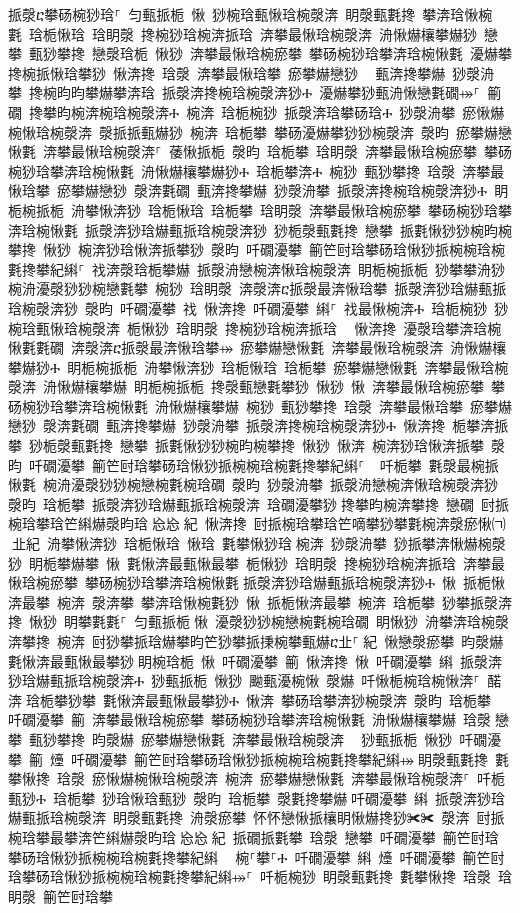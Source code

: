 ﻿\documentclass[output=paper]{langsci/langscibook}
\begin{document}
\begin{exe}
{\begin{exe}
挀漀ⴀ攀砀椀猀琀⸀ 匀甀挀栀 愀 猀椀琀甀愀琀椀漀渀 眀漀甀氀搀 攀渀琀愀椀氀 琀栀愀琀 琀眀漀 搀椀猀琀椀渀挀琀 渀攀最愀琀椀漀渀 洀愀爀欀攀爀猀 戀攀 甀猀攀搀 戀漀琀栀 愀猀 渀攀最愀琀椀瘀攀 攀砀椀猀琀攀渀琀椀愀氀 瀀爀攀搀椀挀愀琀攀猀 愀渀搀 琀漀 渀攀最愀琀攀 瘀攀爀戀猀 ⠀甀渀搀攀爀 猀漀洀攀 搀椀昀昀攀爀攀渀琀 挀漀渀搀椀琀椀漀渀猀Ⰰ 瀀爀攀猀甀洀愀戀氀礀⤀⸀ 䈀礀 搀攀昀椀渀椀琀椀漀渀Ⰰ 椀渀 琀栀椀猀 挀漀渀琀攀砀琀Ⰰ 猀漀洀攀 瘀愀爀椀愀琀椀漀渀 漀挀挀甀爀猀 椀渀 琀栀攀 攀砀瀀爀攀猀猀椀漀渀 漀昀 瘀攀爀戀愀氀 渀攀最愀琀椀漀渀⸀ 䔀愀挀栀 漀昀 琀栀攀 琀眀漀 渀攀最愀琀椀瘀攀 攀砀椀猀琀攀渀琀椀愀氀 洀愀爀欀攀爀猀Ⰰ 琀栀攀渀Ⰰ 椀猀 甀猀攀搀 琀漀 渀攀最愀琀攀 瘀攀爀戀猀 漀渀氀礀 甀渀搀攀爀 猀漀洀攀 挀漀渀搀椀琀椀漀渀猀Ⰰ 眀栀椀挀栀 洀攀愀渀猀 琀栀愀琀 琀栀攀 琀眀漀 渀攀最愀琀椀瘀攀 攀砀椀猀琀攀渀琀椀愀氀 挀漀渀猀琀爀甀挀琀椀漀渀猀 猀栀漀甀氀搀 戀攀 挀氀愀猀猀椀昀椀攀搀 愀猀 椀渀猀琀愀渀挀攀猀 漀昀 吀礀瀀攀 䈀笀尀琀攀砀琀愀猀挀椀椀琀椀氀搀攀紀䌀⸀ 䄀渀漀琀栀攀爀 挀漀洀戀椀渀愀琀椀漀渀 眀栀椀挀栀 猀攀攀洀猀 椀洀瀀漀猀猀椀戀氀攀 椀猀 琀眀漀 渀漀渀ⴀ挀漀最渀愀琀攀 挀漀渀猀琀爀甀挀琀椀漀渀猀 漀昀 吀礀瀀攀 䄀 愀渀搀 吀礀瀀攀 䌀⸀ 䄀最愀椀渀Ⰰ 琀栀椀猀 猀椀琀甀愀琀椀漀渀 栀愀猀 琀眀漀 搀椀猀琀椀渀挀琀 ⠀愀渀搀 瀀漀琀攀渀琀椀愀氀氀礀 渀漀渀ⴀ挀漀最渀愀琀攀⤀ 瘀攀爀戀愀氀 渀攀最愀琀椀漀渀 洀愀爀欀攀爀猀Ⰰ 眀栀椀挀栀 洀攀愀渀猀 琀栀愀琀 琀栀攀 瘀攀爀戀愀氀 渀攀最愀琀椀漀渀 洀愀爀欀攀爀 眀栀椀挀栀 搀漀甀戀氀攀猀 愀猀 愀 渀攀最愀琀椀瘀攀 攀砀椀猀琀攀渀琀椀愀氀 洀愀爀欀攀爀 椀猀 甀猀攀搀 琀漀 渀攀最愀琀攀 瘀攀爀戀猀 漀渀氀礀 甀渀搀攀爀 猀漀洀攀 挀漀渀搀椀琀椀漀渀猀Ⰰ 愀渀搀 栀攀渀挀攀 猀栀漀甀氀搀 戀攀 挀氀愀猀猀椀昀椀攀搀 愀猀 愀渀 椀渀猀琀愀渀挀攀 漀昀 吀礀瀀攀 䈀笀尀琀攀砀琀愀猀挀椀椀琀椀氀搀攀紀䌀⸀ ਀਀吀栀攀 氀漀最椀挀愀氀 椀洀瀀漀猀猀椀戀椀氀椀琀礀 漀昀 猀漀洀攀 挀漀洀戀椀渀愀琀椀漀渀猀 漀昀 琀栀攀 挀漀渀猀琀爀甀挀琀椀漀渀 琀礀瀀攀猀਀搀攀昀椀渀攀搀 戀礀 尀挀椀琀攀琀笀䌀爀漀昀琀㄀㤀㤀㄀紀 愀渀搀 尀挀椀琀攀琀笀嘀攀猀攀氀椀渀漀瘀愀㈀　㄀㐀紀 洀攀愀渀猀 琀栀愀琀 愀琀 氀攀愀猀琀਀椀渀 猀漀洀攀 猀挀攀渀愀爀椀漀猀 眀栀攀爀攀 愀 氀愀渀最甀愀最攀 栀愀猀 琀眀漀 搀椀猀琀椀渀挀琀 渀攀最愀琀椀瘀攀 攀砀椀猀琀攀渀琀椀愀氀਀挀漀渀猀琀爀甀挀琀椀漀渀猀Ⰰ 愀 挀栀愀渀最攀 椀渀 漀渀攀 攀渀琀愀椀氀猀 愀 挀栀愀渀最攀 椀渀 琀栀攀 猀攀挀漀渀搀 愀猀 眀攀氀氀⸀ 匀甀挀栀਀愀 瀀漀猀猀椀戀椀氀椀琀礀 眀愀猀 洀攀渀琀椀漀渀攀搀 椀渀 尀猀攀挀琀爀攀昀笀猀攀挀㨀椀攀甀爀ⴀ㐀⸀㄀紀 愀戀漀瘀攀 昀漀爀 氀愀渀最甀愀最攀猀਀眀椀琀栀 愀 吀礀瀀攀 䈀 愀渀搀 愀 吀礀瀀攀 䌀 挀漀渀猀琀爀甀挀琀椀漀渀Ⰰ 猀甀挀栀 愀猀 䬀甀瀀椀愀 漀爀 吀愀栀椀琀椀愀渀⸀ 䤀渀਀琀栀攀猀攀 氀愀渀最甀愀最攀猀Ⰰ 愀渀 攀砀琀攀渀猀椀漀渀 漀昀 琀栀攀 吀礀瀀攀 䈀 渀攀最愀琀椀瘀攀 攀砀椀猀琀攀渀琀椀愀氀 洀愀爀欀攀爀 琀漀਀戀攀 甀猀攀搀 昀漀爀 瘀攀爀戀愀氀 渀攀最愀琀椀漀渀 ⠀猀甀挀栀 愀猀 吀礀瀀攀 䈀 㸀 吀礀瀀攀 䈀笀尀琀攀砀琀愀猀挀椀椀琀椀氀搀攀紀䌀⤀਀眀漀甀氀搀 氀攀愀搀 琀漀 瘀愀爀椀愀琀椀漀渀 椀渀 瘀攀爀戀愀氀 渀攀最愀琀椀漀渀⸀ 吀栀甀猀Ⰰ 琀栀攀 猀琀愀琀甀猀 漀昀 琀栀攀 漀氀搀攀爀਀吀礀瀀攀 䌀 挀漀渀猀琀爀甀挀琀椀漀渀 眀漀甀氀搀 洀漀瘀攀 怀怀戀愀挀欀眀愀爀搀猀✀✀ 漀渀 尀挀椀琀攀最攀渀笀䌀爀漀昀琀㄀㤀㤀㄀紀 挀礀挀氀攀 琀漀 戀攀 吀礀瀀攀 䈀笀尀琀攀砀琀愀猀挀椀椀琀椀氀搀攀紀䌀 ⠀椀⸀攀⸀Ⰰ 吀礀瀀攀 䌀 㸀 吀礀瀀攀 䈀笀尀琀攀砀琀愀猀挀椀椀琀椀氀搀攀紀䌀⤀⸀ 吀栀椀猀 眀漀甀氀搀 氀攀愀搀 琀漀 琀眀漀 䈀笀尀琀攀
\end{exe}}
\end{exe}
\end{document}
